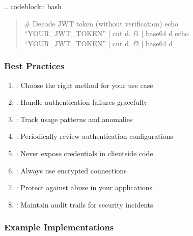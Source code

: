 \documentclass[letterpaper,10pt,english]{sphinxmanual}
\begin{document}
\sphinxAtStartPar
{}
.. code\sphinxhyphen{}block:: bash
\begin{quote}

\sphinxAtStartPar
\# Decode JWT token (without verification)
echo “YOUR\_JWT\_TOKEN” | cut \sphinxhyphen{}d. \sphinxhyphen{}f1 | base64 \sphinxhyphen{}d
echo “YOUR\_JWT\_TOKEN” | cut \sphinxhyphen{}d. \sphinxhyphen{}f2 | base64 \sphinxhyphen{}d
\end{quote}


\subsubsection{Best Practices}
\label{\detokenize{api/authentication:best-practices}}\begin{enumerate}
%
\item {} 
\sphinxAtStartPar
{}: Choose the right method for your use case

\item {} 
\sphinxAtStartPar
{}: Handle authentication failures gracefully

\item {} 
\sphinxAtStartPar
{}: Track usage patterns and anomalies

\item {} 
\sphinxAtStartPar
{}: Periodically review authentication configurations

\item {} 
\sphinxAtStartPar
{}: Never expose credentials in client\sphinxhyphen{}side code

\item {} 
\sphinxAtStartPar
{}: Always use encrypted connections

\item {} 
\sphinxAtStartPar
{}: Protect against abuse in your applications

\item {} 
\sphinxAtStartPar
{}: Maintain audit trails for security incidents

\end{enumerate}


\subsubsection{Example Implementations}
\label{\detokenize{api/authentication:example-implementations}}
\end{document}
